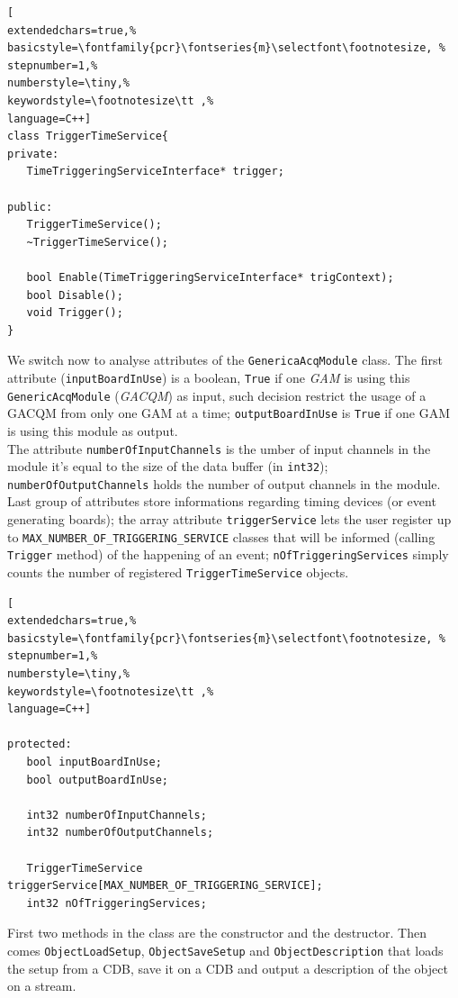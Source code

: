 \begin{lstlisting}[
extendedchars=true,%
basicstyle=\fontfamily{pcr}\fontseries{m}\selectfont\footnotesize, %
stepnumber=1,%
numberstyle=\tiny,%
keywordstyle=\footnotesize\tt ,%
language=C++]
class TriggerTimeService{
private:
   TimeTriggeringServiceInterface* trigger;

public:
   TriggerTimeService();
   ~TriggerTimeService();

   bool Enable(TimeTriggeringServiceInterface* trigContext);
   bool Disable();
   void Trigger();
}
\end{lstlisting}

We switch now to analyse attributes of the \texttt{GenericaAcqModule} class.
The first attribute (\texttt{inputBoardInUse}) is a boolean, \texttt{True} if one \textit{GAM} is using this \texttt{GenericAcqModule} (\textit{GACQM}) as input, such decision restrict the usage of a GACQM from only one GAM at a time; \texttt{outputBoardInUse} is \texttt{True} if one GAM is using this module as output. \\


The attribute \texttt{numberOfInputChannels} is the umber of input channels in the module it's equal to the size of the data buffer (in \texttt{int32}); \texttt{numberOfOutputChannels} holds the number of output channels in the module. \\


Last group of attributes store informations regarding timing devices (or event generating boards); the array attribute \texttt{triggerService} lets the user register up to \texttt{MAX\_NUMBER\_OF\_TRIGGERING\_SERVICE} classes that will be informed (calling \texttt{Trigger} method) of the happening of an event; \texttt{nOfTriggeringServices} simply counts the number of registered \texttt{TriggerTimeService} objects.

\begin{lstlisting}[
extendedchars=true,%
basicstyle=\fontfamily{pcr}\fontseries{m}\selectfont\footnotesize, %
stepnumber=1,%
numberstyle=\tiny,%
keywordstyle=\footnotesize\tt ,%
language=C++]

protected:
   bool inputBoardInUse;
   bool outputBoardInUse;

   int32 numberOfInputChannels;
   int32 numberOfOutputChannels;

   TriggerTimeService triggerService[MAX_NUMBER_OF_TRIGGERING_SERVICE];
   int32 nOfTriggeringServices;
\end{lstlisting}

First two methods in the class are the constructor and the destructor. Then comes \texttt{ObjectLoadSetup}, \texttt{ObjectSaveSetup} and \texttt{ObjectDescription} that loads the setup from a CDB, save it on a CDB and output a  description of the object on a stream. \\


